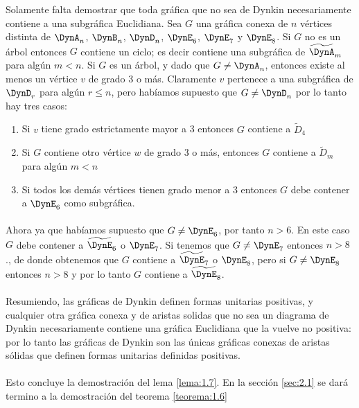 Solamente falta demostrar que toda gráfica que no sea de Dynkin necesariamente contiene a una subgráfica Euclidiana. Sea $G$ una gráfica conexa de $n$ vértices distinta de $\DynA_{n}$, $\DynB_{n}$, $\DynD_{n}$, $\DynE_{6}$, $\DynE_{7}$ y $\DynE_{8}$. Si $G$ no es un árbol entonces $G$ contiene un ciclo; es decir contiene una subgráfica de $\widetilde{\DynA}_{m}$ para algún $m < n$. Si $G$ es un árbol, y dado que $G \neq \DynA_{n}$, entonces existe al menos un vértice $v$ de grado 3 o más. Claramente $v$ pertenece a una subgráfica de $\DynD_{r}$ para algún $r \leq n$, pero habíamos supuesto que $G \neq \DynD_{n}$ por lo tanto hay tres casos:
\begin{enumerate}
    \item Si $v$ tiene grado estrictamente mayor a 3 entonces $G$ contiene a $\widetilde{D}_{4}$
    \item Si $G$ contiene otro vértice $w$ de grado 3 o más, entonces $G$ contiene a $\widetilde{D}_{m}$ para algún $m < n$
    \item Si todos los demás vértices tienen grado menor a 3 entonces $G$ debe contener a $\DynE_{6}$ como subgráfica.
\end{enumerate}

\paragraph{}
Ahora ya que habíamos supuesto que $G \neq \DynE_{6}$, por tanto $n > 6$. En este caso $G$ debe contener a $\widetilde{\DynE}_{6}$ o $\DynE_{7}$. Si tenemos que $G \neq \DynE_{7}$ entonces $n > 8$., de donde obtenemos que $G$ contiene a $\widetilde{\DynE}_{7}$ o $\DynE_{8}$, pero si $G \neq \DynE_{8}$ entonces $n > 8$ y por lo tanto $G$ contiene a $\widetilde{\DynE}_{8}$.
\paragraph{}
Resumiendo, las gráficas de Dynkin definen formas unitarias positivas, y cualquier otra gráfica conexa y de aristas solidas que no sea un diagrama de Dynkin necesariamente contiene una gráfica Euclidiana que la vuelve no positiva: por lo tanto las gráficas de Dynkin son las únicas gráficas conexas de aristas sólidas que definen formas unitarias definidas positivas.
\paragraph{}
Esto concluye la demostración del lema \ref{lema:1.7}.
En la sección \ref{sec:2.1} se dará termino a la demostración del teorema \ref{teorema:1.6}